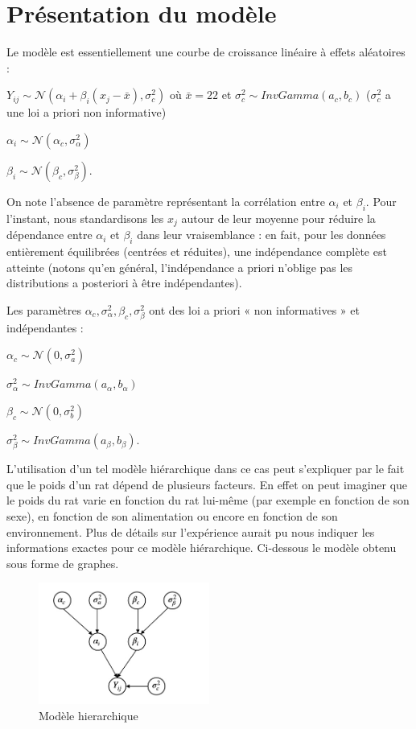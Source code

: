 \documentclass[
]{article}
\begin{document}
\hypertarget{pruxe9sentation-du-moduxe8le}{%
\section{Présentation du modèle}\label{pruxe9sentation-du-moduxe8le}}

Le modèle est essentiellement une courbe de croissance linéaire à effets
aléatoires :

\(Y_{ij} \sim \mathcal N(\alpha_i + \beta_i(x_j - \bar x), \sigma_c ^2)\)
où \(\bar x = 22\) et \(\sigma_c ^2 \sim InvGamma(a_c,b_c)\)
(\(\sigma_c ^2\) a une loi a priori non informative)

\(\alpha_i \sim \mathcal N(\alpha_c,\sigma_{\alpha}^2)\)

\(\beta_i \sim \mathcal N(\beta_c,\sigma_{\beta}^2)\).

On note l'absence de paramètre représentant la corrélation entre
\(\alpha_i\) et \(\beta_i\). Pour l'instant, nous standardisons les
\(x_j\) autour de leur moyenne pour réduire la dépendance entre
\(\alpha_i\) et \(\beta_i\) dans leur vraisemblance : en fait, pour les
données entièrement équilibrées (centrées et réduites), une indépendance
complète est atteinte (notons qu'en général, l'indépendance a priori
n'oblige pas les distributions a posteriori à être indépendantes).

Les paramètres
\(\alpha_c, \sigma_{\alpha}^2, \beta_c, \sigma_{\beta}^2\) ont des loi a
priori « non informatives » et indépendantes :

\(\alpha_c \sim\mathcal N(0,\sigma_a^2)\)

\(\sigma_{\alpha}^2 \sim InvGamma(a_{\alpha},b_{\alpha})\)

\(\beta_c \sim \mathcal N(0,\sigma_b^2)\)

\(\sigma_{\beta}^2 \sim InvGamma(a_{\beta},b_{\beta})\).

L'utilisation d'un tel modèle hiérarchique dans ce cas peut s'expliquer
par le fait que le poids d'un rat dépend de plusieurs facteurs. En effet
on peut imaginer que le poids du rat varie en fonction du rat lui-même
(par exemple en fonction de son sexe), en fonction de son alimentation
ou encore en fonction de son environnement. Plus de détails sur
l'expérience aurait pu nous indiquer les informations exactes pour ce
modèle hiérarchique. Ci-dessous le modèle obtenu sous forme de graphes.

\begin{figure}
\centering
\includegraphics[width=0.5\textwidth,height=\textheight]{Model.jpg}
\caption{Modèle hierarchique}
\end{figure}
\end{document}
